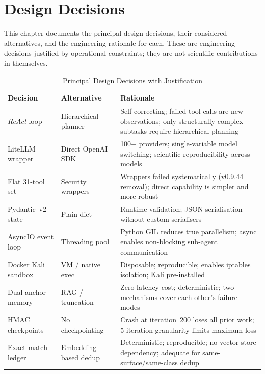 \documentclass[12pt, a4paper, oneside, openany]{book}
\begin{document}
\chapter{Design Decisions}
\label{chap:design}

This chapter documents the principal design decisions, their
considered alternatives, and the engineering rationale for each.
These are engineering decisions justified by operational constraints;
they are not scientific contributions in themselves.

\begin{table}[H]
\centering
\caption{Principal Design Decisions with Justification}
\label{tab:design}
\begin{tabularx}{\textwidth}{@{}l l X@{}}
\toprule
\textbf{Decision} & \textbf{Alternative} & \textbf{Rationale} \\
\midrule
\textit{ReAct} loop & Hierarchical planner & Self-correcting; failed tool calls are new observations; only structurally complex subtasks require hierarchical planning \citep{yao2023react} \\
LiteLLM wrapper & Direct OpenAI SDK & 100+ providers; single-variable model switching; scientific reproducibility across models \citep{litellm2023} \\
Flat 31-tool set & Security wrappers & Wrappers failed systematically (v0.9.44 removal); direct capability is simpler and more robust \\
Pydantic~v2 state & Plain dict & Runtime validation; JSON serialisation without custom serialisers \\
AsyncIO event loop & Threading pool & Python GIL reduces true parallelism; async enables non-blocking sub-agent communication \\
Docker Kali sandbox & VM / native exec & Disposable; reproducible; enables iptables isolation; Kali pre-installed \citep{docker2024} \\
Dual-anchor memory & RAG / truncation & Zero latency cost; deterministic; two mechanisms cover each other's failure modes \\
HMAC checkpoints & No checkpointing & Crash at iteration~200 loses all prior work; 5-iteration granularity limits maximum loss \\
Exact-match ledger & Embedding-based dedup & Deterministic; reproducible; no vector-store dependency; adequate for same-surface/same-class dedup \\
\bottomrule
\end{tabularx}
\end{table}
\end{document}
